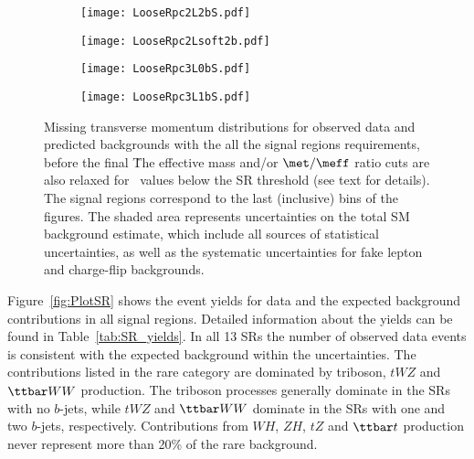 \begin{figure}[p!]
\centering
   \begin{subfigure}{0.42\textwidth}
 \texttt{[image: LooseRpc2L2bS.pdf]}
 \end{subfigure}
   \begin{subfigure}{0.42\textwidth}
 \texttt{[image: LooseRpc2Lsoft2b.pdf]}
 \end{subfigure}
   \begin{subfigure}{0.42\textwidth}
 \texttt{[image: LooseRpc3L0bS.pdf]}
 \end{subfigure}
    \begin{subfigure}{0.42\textwidth}
 \texttt{[image: LooseRpc3L1bS.pdf]}
 \end{subfigure}
   \caption{
Missing transverse momentum distributions for observed data and predicted backgrounds 
with the all the signal regions requirements, before the final \met\. 
The effective mass and/or $\met/\meff$ ratio cuts are also relaxed for \met\ values below the SR threshold (see text for details). 
The signal regions correspond to the last (inclusive) bins of the figures. 
The shaded area represents uncertainties on the total SM background estimate, 
which include all sources of statistical uncertainties, 
as well as the systematic uncertainties for fake lepton and charge-flip backgrounds. 
}
\label{fig:results_datamc_rpc}
\end{figure}


Figure~\ref{fig:PlotSR} shows the event yields for data and the expected background contributions 
in all signal regions. Detailed information about the yields can be found in Table~\ref{tab:SR_yields}.
In all 13 SRs the number of observed data events is consistent with the expected background within the uncertainties. 
The contributions listed in the rare category are dominated by triboson, $tWZ$ and $\ttbar WW$ production.
The triboson processes generally dominate in the SRs with no $b$-jets, while $tWZ$ and $\ttbar WW$
dominate in the SRs with one and two $b$-jets, respectively. Contributions from $WH$, $ZH$, $tZ$ and $\ttbar t$ production 
never represent more than 20\% of the rare background.

